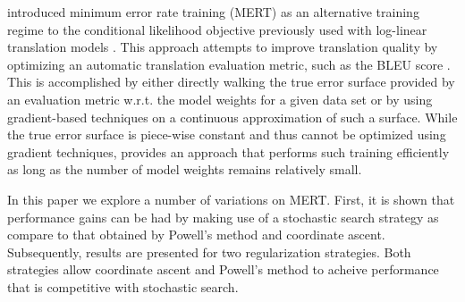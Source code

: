 \documentclass[11pt]{article}
\begin{document}



 introduced minimum error rate training (MERT) as an alternative training regime to the conditional likelihood objective previously used with log-linear translation models \cite{och2002}. This approach attempts to improve translation quality by optimizing an automatic translation evaluation metric, such as the BLEU score \cite{kishore2002}. This is accomplished by either directly walking the true error surface provided by an evaluation metric w.r.t. the model weights for a given data set or by using gradient-based techniques on a continuous approximation of such a surface. While the true error surface is piece-wise constant and thus cannot be optimized using gradient techniques,  provides an approach that performs such training efficiently as long as the number of model weights remains relatively small. 

In this paper we explore a number of variations on MERT. First, it is shown that performance gains can be had by making use of a stochastic search strategy as compare to that obtained by Powell's method and coordinate ascent. Subsequently, results are presented for two regularization strategies. Both strategies allow coordinate ascent and Powell's method to acheive performance that is competitive with stochastic search. 
\end{document}
